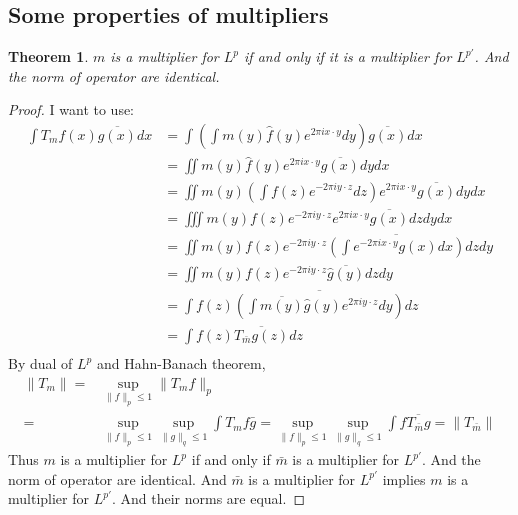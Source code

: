 \documentclass{report}
\theoremstyle{definition}
\theoremstyle{definition}
\theoremstyle{plain}
\newtheorem{theorem}{Theorem}
\numberwithin{theorem}{subsection}
\numberwithin{remark}{subsection}
\newcommand{\norm}[1]{\lVert#1\rVert}
\begin{document}
\subsection{Some properties of multipliers}
\begin{theorem}\label{dual of multiplier}
    $m$ is a multiplier for $L^p$ if and only if it is a multiplier for $L^{p'}$. And the norm of operator are identical.
\end{theorem}
\begin{proof}
    I want to use:
    \begin{align*}
        \int T_mf(x)\overline{g(x)}dx & =\int (\int m(y)\hat{f}(y) e^{2\pi i x\cdot y}d y)\overline{g(x)}dx                      \\
                                      & =\iint m(y)\hat{f}(y) e^{2\pi i x\cdot y}\overline{g(x)}d y d x                          \\
                                      & =\iint m(y)(\int f(z)e^{-2\pi i y\cdot z}d z) e^{2\pi i x\cdot y}\overline{g(x)}d y d x  \\
                                      & =\iiint m(y)f(z)e^{-2\pi i y\cdot z}e^{2\pi i x\cdot y}\overline{g(x)}d z d y d x        \\
                                      & =\iint m(y)f(z)e^{-2\pi i y\cdot z}\overline{(\int e^{-2\pi i x\cdot y}{g(x)}dx)}d z d y \\
                                      & =\iint m(y)f(z)e^{-2\pi i y\cdot z}\overline{\hat{g}(y)}d z d y                          \\
                                      & =\int f(z)\overline{(\int \overline{m(y)}\hat{g}(y)e^{2\pi i y\cdot z}d y)}d z           \\
                                      & =\int f(z)\overline{T_{\bar{m}}g(z)}d z                                                  \\
    \end{align*}
    By dual of $L^p$ and Hahn-Banach theorem,
    \begin{align*}
        \norm{T_m}= & \sup_{\norm{f}_p\leq 1}\norm{T_mf}_p                                                                                                                          \\
        =           & \sup_{\norm{f}_p\leq 1}\sup_{\norm{g}_q\leq 1}\int T_mf\bar{g}=\sup_{\norm{f}_p\leq 1}\sup_{\norm{g}_q\leq 1}\int f\overline{T_{\bar{m}}g}=\norm{T_{\bar{m}}}
    \end{align*}
    Thus $m$ is a multiplier for $L^p$ if and only if $\bar{m}$ is a multiplier for $L^{p'}$. And the norm of operator are identical. And $\bar{m}$ is a multiplier for $L^{p'}$ implies $m$ is a multiplier for $L^{p'}$.
    And their norms are equal.
\end{proof}
\end{document}
